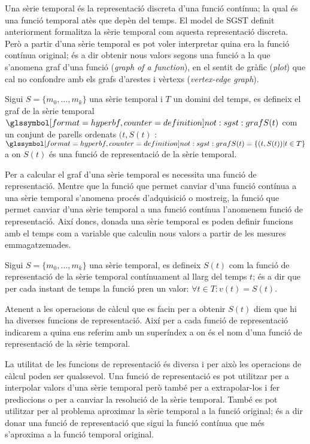 Una sèrie temporal és la representació discreta d'una funció contínua;
la qual és una funció temporal atès que depèn del temps. El model de
SGST definit anteriorment formalitza la sèrie temporal com aquesta
representació discreta. Però a partir d'una sèrie temporal es pot
voler interpretar quina era la funció contínua original; és a dir
obtenir nous valors segons una funció a la que s'anomena graf d'una
funció (\emph{graph of a function}), en el sentit de gràfic
(\emph{plot}) que cal no confondre amb els grafs d'arestes i vèrtexs
(\emph{vertex-edge graph}).

\begin{definition}%
  Sigui $S=\{m_0,\ldots,m_k\}$ una sèrie temporal i $T$ un domini del
  temps, es defineix el graf de la sèrie temporal
  $\glssymboldef{not:sgst:graf} S(t)$ com un conjunt de parells
  ordenats $(t,S(t)$ : $\glssymboldef{not:sgst:graf} S(t) = \{ (t,S(t)) |
  t\in T \}$ a on $S(t)$ és una funció de representació de la sèrie
  temporal.
\end{definition}

Per a calcular el graf d'una sèrie temporal es necessita una funció de
representació. Mentre que la funció que permet canviar d'una funció
contínua a una sèrie temporal s'anomena procés d'adquisició o
mostreig, la funció que permet canviar d'una sèrie temporal a una
funció contínua l'anomenem funció de representació.  Així doncs,
donada una sèrie temporal es poden definir funcions amb el temps com a
variable que calculin nous valors a partir de les mesures
emmagatzemades.
\begin{definition}
  Sigui $S=\{m_0,\ldots,m_k\}$ una sèrie temporal, es defineix $S(t)$
  com la funció de representació de la sèrie temporal contínuament al
  llarg del temps $t$; és a dir que per cada instant de temps la
  funció pren un valor: $\forall t\in T: v(t) = S(t)$. 

  Atenent a les operacions de càlcul que es facin per a obtenir $S(t)$
  diem que hi ha diverses funcions de representació. Així per a cada
  funció de representació indicarem a quina ens referim amb un
  superíndex  a on
   és el nom d'una funció de representació
  de la sèrie temporal.
\end{definition}

La utilitat de les funcions de representació és diversa i per això les
operacions de càlcul poden ser qualssevol. Una funció de representació
es pot utilitzar per a interpolar valors d'una sèrie temporal però
també per a extrapolar-los i fer prediccions o per a canviar la
resolució de la sèrie temporal. També es pot utilitzar per al problema
aproximar la sèrie temporal a la funció original; és a dir donar una
funció de representació que sigui la funció contínua que més
s'aproxima a la funció temporal original.


